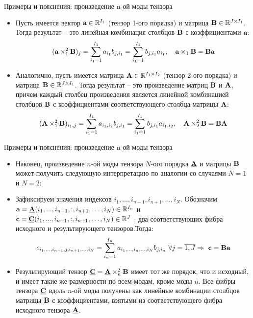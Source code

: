 \begin{frame}{Примеры и пояснения: произведение n-ой моды тензора}
 

    \begin{itemize}
        \item Пусть имеется вектор $\textbf{a} \in \mathbb{R}^{I_1}$ (тензор 1-ого порядка) и матрица $\textbf{B} \in \mathbb{R}^{J \times I_1}$. Тогда результат -- это линейная комбинация столбцов $\textbf{B}$ с коэффициентами $\textbf{a}$:
        $$ (\textbf{a} \times_1^2 \textbf{B})_j = \sum_{i_1 = 1}^{I_1} a_{i_1}b_{j, i_1} = \sum_{i_1 = 1}^{I_1} b_{j, i_1}a_{i_1}, \quad  \textbf{a} \times_1 \textbf{B} = \textbf{B}\textbf{a}$$


        \item Аналогично, пусть имеется матрица $\textbf{A} \in \mathbb{R}^{I_1 \times I_2}$ (тензор 2-ого порядка) и матрица $\textbf{B} \in \mathbb{R}^{J \times I_1}$.  Тогда результат -- это произведение матриц  $\textbf{B}$ и $\textbf{A}$,  причем каждый столбец произведения является линейной комбинацией столбцов $\textbf{B}$ с коэффициентами соответствующего столбца матрицы $\textbf{A}$:
        $$ (\textbf{A} \times_1^2 \textbf{B})_{i_1,j} = \sum_{i_1 = 1}^{I_1} a_{i_1, i_2}b_{j, i_1} = \sum_{i_1 = 1}^{I_1} b_{j, i_1} a_{i_1, i_2}, \quad  \textbf{A} \times_2^2 \textbf{B} = \textbf{B}\textbf{A}$$
        
    \end{itemize}


\end{frame}
\begin{frame}{Примеры и пояснения: произведение n-ой моды тензора}

 \vspace{0.2cm}

    \begin{itemize}
        \item Наконец, произведение $n$-ой моды тензора $N$-ого порядка $\underline{\textbf{A}}$ и матрицы $\textbf{B}$ может получить следующую интерпретацию по аналогии со случаями $N=1$ и $N=2$: 
        \item Зафиксируем значения индексов $i_1, ..., i_{n-1}, i_{n+1}, ..., i_N$. Обозначим $\textbf{a} = \underline{\textbf{A}}(i_1, ..., i_{n-1}, : , i_{n+1}, \dots, i_N) \in \mathbb{R}^{I_n}$ и $\textbf{c} = \underline{\textbf{C}}(i_1, ..., i_{n-1}, : , i_{n+1}, \dots, i_N) \in \mathbb{R}^{J}$  - два соответствующих фибра исходного и результирующего тензоров.Тогда:
        $$ c_{i_1, ..., i_{n-1}, j, i_{n+1}, ..., i_N} = \sum_{i_n = 1}^{I_n} a_{i_1, ..., i_n, ..., i_N} b_{j,i_n} \ \forall j = \overline{1, J} \Rightarrow \ \textbf{c} = \textbf{B}\textbf{a}$$
        \item Результирующий тензор $\underline{\textbf{C}} = \underline{\textbf{A}} \times_n^2 \textbf{B}$ имеет тот же порядок, что и исходный, и имеет такие же размерности по всем модам, кроме моды $n$. Все фибры тензора $\underline{\textbf{C}}$ вдоль $n$-ой моды получены как линейные комбинации столбцов матрицы $\textbf{B}$ с коэффициентами, взятыми из соответствующего фибра исходного тензора $\underline{\textbf{A}}$.
 

        $$ $$
        
    \end{itemize}
    
\end{frame}

